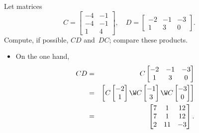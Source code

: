 \begin{example} \label{eg:}
Let matrices
\begin{equation*}
C=\begin{bmatrix} -4 & -1\\ -4 & -1\\ 1 & 4 \end{bmatrix},\quad
D=\begin{bmatrix} -2 & -1 & -3\\ 1 & 3 & 0 \end{bmatrix}.
\end{equation*}
Compute, if possible, \(CD\) and~\(DC\); compare these products.
\begin{solution} 
\begin{itemize}
\item On the one hand,
\begin{eqnarray*}
CD&=&C\begin{bmatrix} -2 & -1 & -3\\ 1 & 3 & 0 \end{bmatrix}
\\&=&\begin{bmatrix} C\begin{bmatrix} -2\\1 \end{bmatrix}\W
C\begin{bmatrix} -1\\3 \end{bmatrix}\W
C\begin{bmatrix} -3\\0 \end{bmatrix}
 \end{bmatrix}
\\&=&\begin{bmatrix} 7&1&12\\7&1&12\\2&11&-3 \end{bmatrix}.
\end{eqnarray*}


\end{itemize}
\end{solution}
\end{example}
